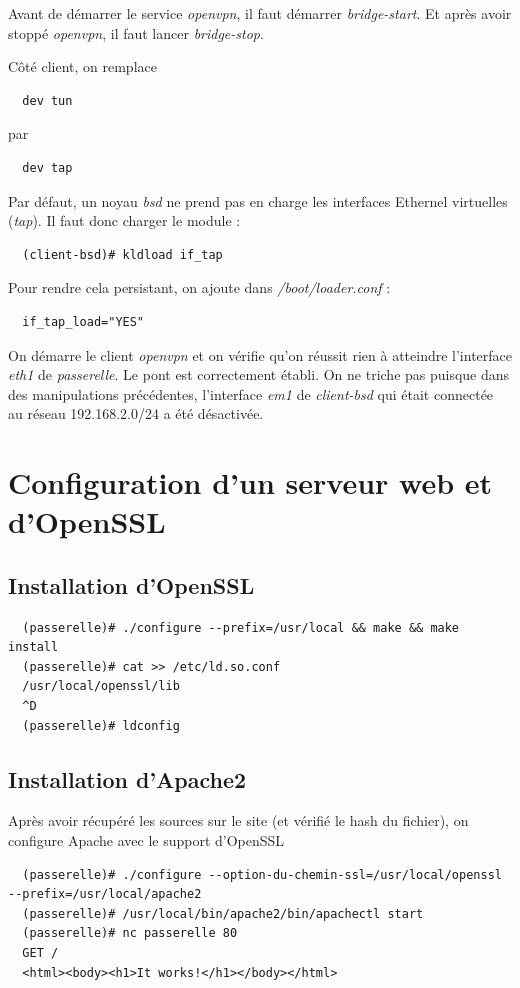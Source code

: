 \documentclass[a4paper]{article}
\begin{document}
Avant de démarrer le service \textit{openvpn}, il faut démarrer \textit{bridge-start}.
Et après avoir stoppé \textit{openvpn}, il faut lancer \textit{bridge-stop}.

Côté client, on remplace
\begin{verbatim}
  dev tun
\end{verbatim}
par
\begin{verbatim}
  dev tap
\end{verbatim}

Par défaut, un noyau \textit{bsd} ne prend pas en charge les interfaces Ethernel virtuelles (\textit{tap}).
Il faut donc charger le module :
\begin{verbatim}
  (client-bsd)# kldload if_tap
\end{verbatim}

Pour rendre cela persistant, on ajoute dans \textit{/boot/loader.conf} :
\begin{verbatim}
  if_tap_load="YES"
\end{verbatim}

On démarre le client \textit{openvpn} et on vérifie qu'on réussit rien à atteindre
l'interface \textit{eth1} de \textit{passerelle}. Le pont est correctement établi.
On ne triche pas puisque dans des manipulations précédentes, l'interface \textit{em1}
de \textit{client-bsd} qui était connectée au réseau 192.168.2.0/24 a été désactivée.

\section{Configuration d'un serveur web et d'OpenSSL}
\subsection{Installation d'OpenSSL}
\begin{verbatim}
  (passerelle)# ./configure --prefix=/usr/local && make && make install
  (passerelle)# cat >> /etc/ld.so.conf
  /usr/local/openssl/lib
  ^D
  (passerelle)# ldconfig
\end{verbatim}

\subsection{Installation d'Apache2}
Après avoir récupéré les sources sur le site (et vérifié le hash du fichier), on configure
Apache avec le support d'OpenSSL
\begin{verbatim}
  (passerelle)# ./configure --option-du-chemin-ssl=/usr/local/openssl --prefix=/usr/local/apache2
  (passerelle)# /usr/local/bin/apache2/bin/apachectl start
  (passerelle)# nc passerelle 80
  GET /
  <html><body><h1>It works!</h1></body></html>
\end{verbatim}
\end{document}
